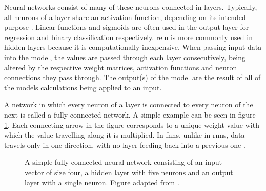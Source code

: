 Neural networks consist of many of these neurons connected in layers.
Typically, all neurons of a layer share an activation function, depending on its intended purpose \cite{Jurafsky.2024}.
Linear functions and sigmoids are often used in the output layer for regression and binary classification respectively.
\ac{relu} is more commonly used in hidden layers because it is computationally inexpensive.
When passing input data into the model, the values are passed through each layer consecutively, being altered by the respective weight matrices, activation functions and neuron connections they pass through.
The output(s) of the model are the result of all of the models calculations being applied to an input.

A network in which every neuron of a layer is connected to every neuron of the next is called a fully-connected network.
A simple example can be seen in figure \ref{fig:nn}.
Each connecting arrow in the figure corresponds to a unique weight value with which the value travelling along it is multiplied.
In \acp{fnn}, unlike in \acp{rnn}, data travels only in one direction, with no layer feeding back into a previous one \cite{Jurafsky.2024}.

\begin{figure}
    \centering
    \caption{A simple fully-connected neural network consisting of an input vector of size four, a hidden layer with five neurons and an output layer with a single neuron. Figure adapted from \cite{Jurafsky.2024}.}
    \label{fig:nn}
\end{figure}

